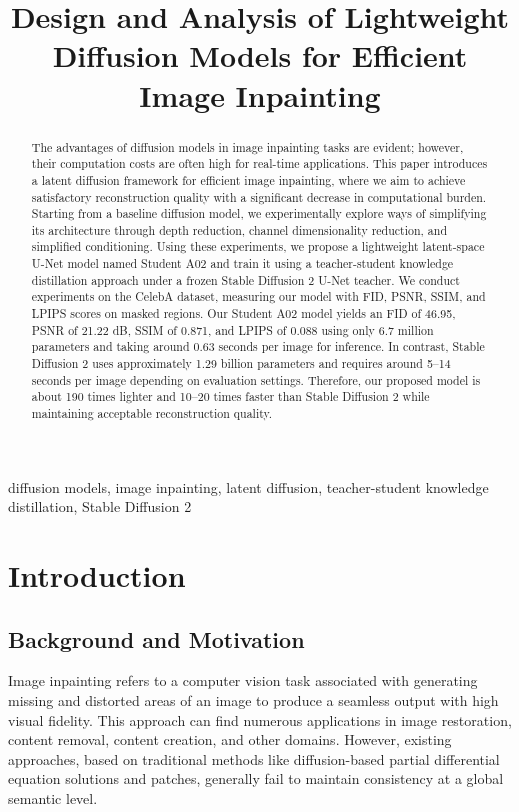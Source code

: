 \documentclass[journal]{IEEEtran}
\title{Design and Analysis of Lightweight Diffusion Models for Efficient Image Inpainting}
\author{\IEEEauthorblockN{Md Minhajul Islam, Kazi Tazrian Mon, and Nur Ibne Kawsar Zitu}
\IEEEauthorblockA{Department of Electrical and Computer Engineering\\
North South University, Dhaka, Bangladesh}}
\begin{document}
\maketitle

\begin{abstract}
The advantages of diffusion models in image inpainting tasks are evident; however, their computation costs are often high for real-time applications. This paper introduces a latent diffusion framework for efficient image inpainting, where we aim to achieve satisfactory reconstruction quality with a significant decrease in computational burden. Starting from a baseline diffusion model, we experimentally explore ways of simplifying its architecture through depth reduction, channel dimensionality reduction, and simplified conditioning. Using these experiments, we propose a lightweight latent-space U-Net model named Student A02 and train it using a teacher-student knowledge distillation approach under a frozen Stable Diffusion 2 U-Net teacher. We conduct experiments on the CelebA dataset, measuring our model with FID, PSNR, SSIM, and LPIPS scores on masked regions. Our Student A02 model yields an FID of 46.95, PSNR of 21.22 dB, SSIM of 0.871, and LPIPS of 0.088 using only 6.7 million parameters and taking around 0.63 seconds per image for inference. In contrast, Stable Diffusion 2 uses approximately 1.29 billion parameters and requires around 5--14 seconds per image depending on evaluation settings. Therefore, our proposed model is about 190 times lighter and 10--20 times faster than Stable Diffusion 2 while maintaining acceptable reconstruction quality.
\end{abstract}

\begin{IEEEkeywords}
diffusion models, image inpainting, latent diffusion, teacher-student knowledge distillation, Stable Diffusion 2
\end{IEEEkeywords}

\section{Introduction}
\subsection{Background and Motivation}
Image inpainting refers to a computer vision task associated with generating missing and distorted areas of an image to produce a seamless output with high visual fidelity. This approach can find numerous applications in image restoration, content removal, content creation, and other domains. However, existing approaches, based on traditional methods like diffusion-based partial differential equation solutions and patches, generally fail to maintain consistency at a global semantic level.
\end{document}
